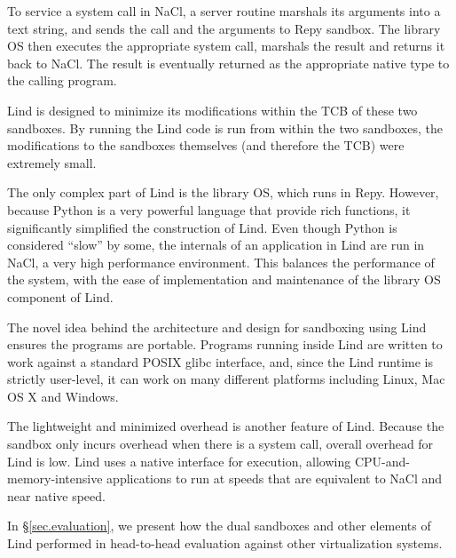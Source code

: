 To service a system call in NaCl, a server routine marshals its arguments into a text string, 
and sends the call and the arguments to Repy sandbox. 
The library OS then executes the appropriate system call, marshals the result and 
returns it back to NaCl. The result is eventually returned as the appropriate native type to the calling program. 

Lind is designed to minimize its modifications within the TCB of these two sandboxes. 
By running the Lind code is run from within the two sandboxes, 
the modifications to the sandboxes themselves (and therefore the TCB) were extremely small. 

The only complex part of Lind is the library OS, which runs in Repy. 
However, because Python is a very powerful language that provide rich functions, 
it significantly simplified the construction of Lind. Even though Python is considered ``slow'' by some, 
the internals of an application in Lind are run in NaCl, a very high performance environment. 
This balances the performance of the system, with the ease of implementation and maintenance 
of the library OS component of Lind. 

The novel idea behind the architecture and design for sandboxing using Lind ensures the programs are portable. 
Programs running inside Lind are written to work against a standard POSIX glibc interface, 
and, since the Lind runtime is strictly user-level, it can work on many different platforms 
including Linux, Mac OS X and Windows.

The lightweight and minimized overhead is another feature of Lind. Because the sandbox only incurs overhead when there is a system call, 
overall overhead for Lind is low. Lind uses a native interface for execution, 
allowing CPU-and-memory-intensive applications to run at speeds that are equivalent to NaCl and near native speed. 


In \S{\ref{sec.evaluation}}, we present how the dual sandboxes and other elements of Lind performed in 
head-to-head evaluation against other virtualization systems.
